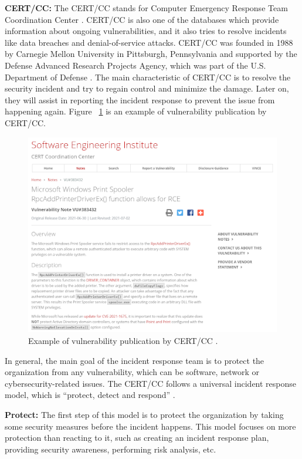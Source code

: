 {\bf CERT/CC:} The \acs{CERT/CC} stands for Computer Emergency Response Team Coordination Center \cite{Web2021}. \acs{CERT/CC} is also one of the databases which provide information about ongoing vulnerabilities, and it also tries to resolve incidents like data breaches and denial-of-service attacks. \acs{CERT/CC} was founded in 1988 by Carnegie Mellon University in Pittsburgh, Pennsylvania and supported by the Defense Advanced Research Projects Agency, which was part of the U.S. Department of Defense \cite{CertDiv}. The main characteristic of \acs{CERT/CC} is to resolve the security incident and try to regain control and minimize the damage. Later on, they will assist in reporting the incident response to prevent the issue from happening again. Figure ~\ref{fig:cert} is an example of vulnerability publication by \acs{CERT/CC}.
\newpage
\begin{figure}[H]
	\includegraphics[width=15cm]{includes/cert-cc.png}
	\centering
	\caption{Example of vulnerability publication by \acs{CERT/CC} \cite{CertDiv}.}
	\label{fig:cert}
\end{figure}

In general, the main goal of the incident response team is to protect the organization from any vulnerability, which can be software, network or cybersecurity-related issues. The \acs{CERT/CC} follows a universal incident response model, which is “protect, detect and respond” \cite{DiWhGo2004}.

	\textbf{Protect:} The first step of this model is to protect the organization by taking some security measures before the incident happens. This model focuses on more protection than reacting to it, such as creating an incident response plan, providing security awareness, performing risk analysis, etc.
	
